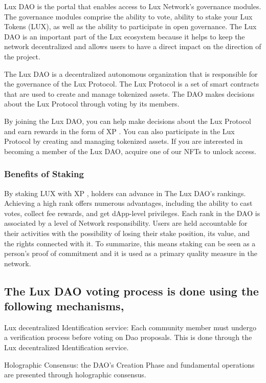 \documentclass[11pt]{article}
\begin{document}
Lux DAO is the portal that enables access to Lux Network's governance modules. The governance modules comprise the ability to vote, ability to stake your Lux Tokens (LUX), as well as the ability to participate in open governance. The Lux DAO is an important part of the Lux ecosystem because it helps to keep the network decentralized and allows users to have a direct impact on the direction of the project.


The Lux DAO is a decentralized autonomous organization that is responsible for the governance of the Lux Protocol. The Lux Protocol is a set of smart contracts that are used to create and manage tokenized assets. The DAO makes decisions about the Lux Protocol through voting by its members.


By joining the Lux DAO, you can help make decisions about the Lux Protocol and earn rewards in the form of XP . You can also participate in the Lux Protocol by creating and managing tokenized assets. If you are interested in becoming a member of the Lux DAO, acquire one of our NFTs to unlock access.


\subsubsection{Benefits of Staking}

By staking LUX with XP , holders can advance in The Lux DAO's rankings. Achieving a high rank offers numerous advantages, including the ability to cast votes, collect fee rewards, and get dApp-level privileges. Each rank in the DAO is associated by a level of Network responsibility. Users are held accountable for their activities with the possibility of losing their stake position, its value, and the rights connected with it. To summarize, this means staking can be seen as a person's proof of commitment and it is used as a primary quality measure in the network.


\subsection{The Lux DAO voting process is done using the following mechanisms,}

Lux decentralized Identification service: Each community member must undergo a verification process before voting on Dao proposals. This is done through the Lux decentralized Identification service.


Holographic Consensus: the DAO's Creation Phase and fundamental operations are presented through holographic consensus.
\end{document}
